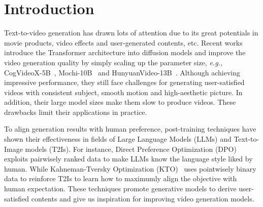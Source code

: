 

\section{Introduction}
\label{sec:intro}

Text-to-video generation has drawn lots of attention due to its great potentials in movie products, video effects and user-generated contents, etc. Recent works~\cite{brooks2024video,kling,hailuo} introduce the Transformer architecture into diffusion models and improve the video generation quality by simply scaling up the parameter size, \emph{e.g.,} CogVideoX-5B~\cite{yang2024cogvideox}, Mochi-10B~\cite{genmo2024mochi} and HunyuanVideo-13B~\cite{kong2024hunyuanvideo}. Although achieving impressive performance, they still face challenges for generating user-satisfied videos with consistent subject, smooth motion and high-aesthetic picture. In addition, their large model sizes make them slow to produce videos. These drawbacks limit their applications in practice.

To align generation results with human preference, post-training techniques have shown their effectiveness in fields of Large Language Models (LLMs) and Text-to-Image models (T2Is). For instance, Direct Preference Optimization (DPO)~\cite{rafailov2024directpreferenceoptimizationlanguage} exploits pairwisely ranked data to make LLMs know the language style liked by human. While Kahneman-Tversky Optimization (KTO)~\cite{ethayarajh2024ktomodelalignmentprospect} uses pointwisely binary data to reinforce T2Is to learn how to maximumly align the objective with human expectation. These techniques promote generative models to derive user-satisfied contents and give us inspiration for improving video generation models.

